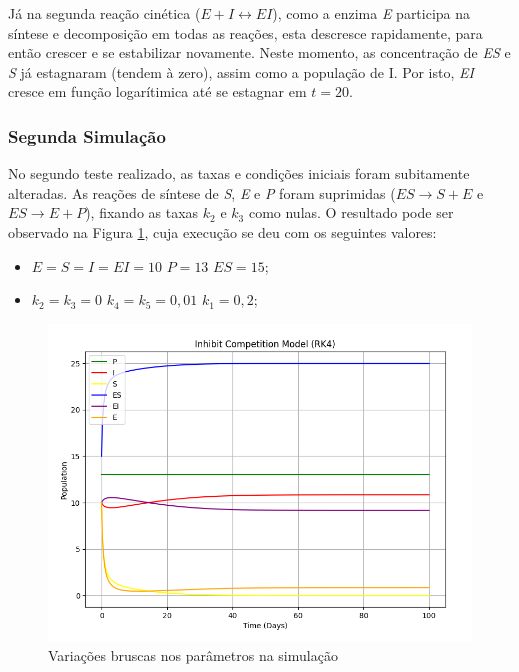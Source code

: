 \documentclass[a4paper, 12pt]{article}
\begin{document}
Já na segunda reação cinética (\(E + I \leftrightarrow EI\)), como a enzima \emph{E} participa na síntese e decomposição em todas as reações, esta descresce rapidamente, para então crescer e se estabilizar novamente. Neste momento, as concentração de \emph{ES} e \emph{S} já estagnaram (tendem à zero), assim como a população de I. Por isto, \emph{EI} cresce em função logarítimica até se estagnar em \(t = 20\).

\subsubsection*{Segunda Simulação}

No segundo teste realizado, as taxas e condições iniciais foram subitamente alteradas. As reações de síntese de \emph{S}, \emph{E} e \emph{P} foram suprimidas (\(ES \rightarrow S + E\) e \(ES \rightarrow E + P\)), fixando as taxas \(k_2\) e \(k_3\) como nulas. O resultado pode ser observado na Figura \ref{fig:exampleFig11}, cuja execução se deu com os seguintes valores:

\begin{itemize}
    \item \(E = S = I = EI = 10\) \hspace{0.1cm}\textbar\hspace{0.1cm} \(P = 13\) \hspace{0.1cm}\textbar\hspace{0.1cm} \(ES = 15\);
    \item \(k_2 = k_3 = 0\) \hspace{0.1cm}\textbar\hspace{0.1cm} \(k_4 = k_5 = 0,01\) \hspace{0.1cm}\textbar\hspace{0.1cm} \(k_1 = 0,2\);
\end{itemize}

\begin{figure}[H]
    \centering
    \includegraphics[width=1\textwidth]{Images/Exercise 3/supressed.png}
    \vspace*{-1cm}
    \caption{Variações bruscas nos parâmetros na simulação}
    \label{fig:exampleFig11}
\end{figure}
\end{document}
